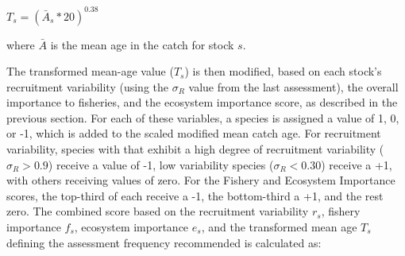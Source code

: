 \documentclass[11pt,
  english,
  a4paper,
]{article}
\begin{document}
\leavevmode\tagmcend\tagstructend\par

\begin{centering}

  $T_s = (\bar{A}_s*20)^{0.38}$

\end{centering}


where {\(\bar{A}\)\leavevmode\tagmcend\tagstructend} is the mean age in the catch for stock {\(s\)\leavevmode\tagmcend\tagstructend}.

\leavevmode\tagmcend\tagstructend\par


The transformed mean-age value ({\(T_s\)\leavevmode\tagmcend\tagstructend}) is then modified, based on each stock's recruitment variability (using the {\(\sigma_R\)\leavevmode\tagmcend\tagstructend} value from the last assessment), the overall importance to fisheries, and the ecosystem importance score, as described in the previous section. For each of these variables, a species is assigned a value of 1, 0, or -1, which is added to the scaled modified mean catch age. For recruitment variability, species with that exhibit a high degree of recruitment variability ({\(\sigma_R > 0.9\)\leavevmode\tagmcend\tagstructend}) receive a value of -1, low variability species ({\(\sigma_R < 0.30\)\leavevmode\tagmcend\tagstructend}) receive a +1, with others receiving values of zero. For the Fishery and Ecosystem Importance scores, the top-third of each receive a -1, the bottom-third a +1, and the rest zero. The combined score based on the recruitment variability {\(r_s\)\leavevmode\tagmcend\tagstructend}, fishery importance {\(f_s\)\leavevmode\tagmcend\tagstructend}, ecosystem importance {\(e_s\)\leavevmode\tagmcend\tagstructend}, and the transformed mean age {\(T_s\)\leavevmode\tagmcend\tagstructend} defining the assessment frequency recommended is calculated as:
\end{document}
